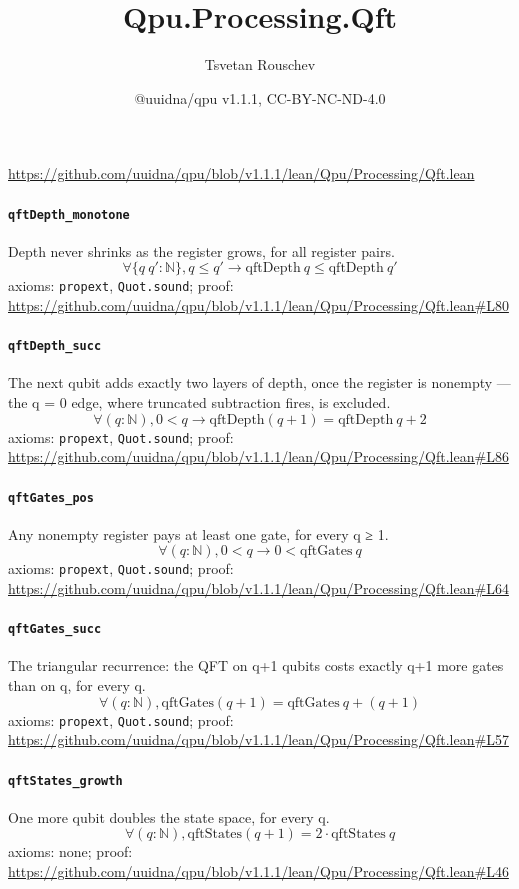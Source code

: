 \documentclass[11pt]{article}
\title{Qpu.Processing.Qft}
\author{Tsvetan Rouschev}
\date{@uuidna/qpu v1.1.1, CC-BY-NC-ND-4.0}
\begin{document}
\maketitle
\noindent\url{https://github.com/uuidna/qpu/blob/v1.1.1/lean/Qpu/Processing/Qft.lean}

\paragraph{\texttt{qftDepth\_monotone}}
Depth never shrinks as the register grows, for all register pairs.
\[ \forall \{q\ q' : \mathbb{N}\}, q \le q' \to \mathrm{qftDepth}\ q \le \mathrm{qftDepth}\ q' \]
\noindent axioms: \texttt{propext}, \texttt{Quot.sound}; proof: \url{https://github.com/uuidna/qpu/blob/v1.1.1/lean/Qpu/Processing/Qft.lean\#L80}

\paragraph{\texttt{qftDepth\_succ}}
The next qubit adds exactly two layers of depth, once the register is nonempty — the q = 0 edge, where truncated subtraction fires, is excluded.
\[ \forall (q : \mathbb{N}), 0 < q \to \mathrm{qftDepth} (q + 1) = \mathrm{qftDepth}\ q + 2 \]
\noindent axioms: \texttt{propext}, \texttt{Quot.sound}; proof: \url{https://github.com/uuidna/qpu/blob/v1.1.1/lean/Qpu/Processing/Qft.lean\#L86}

\paragraph{\texttt{qftGates\_pos}}
Any nonempty register pays at least one gate, for every q ≥ 1.
\[ \forall (q : \mathbb{N}), 0 < q \to 0 < \mathrm{qftGates}\ q \]
\noindent axioms: \texttt{propext}, \texttt{Quot.sound}; proof: \url{https://github.com/uuidna/qpu/blob/v1.1.1/lean/Qpu/Processing/Qft.lean\#L64}

\paragraph{\texttt{qftGates\_succ}}
The triangular recurrence: the QFT on q+1 qubits costs exactly q+1 more gates than on q, for every q.
\[ \forall (q : \mathbb{N}), \mathrm{qftGates} (q + 1) = \mathrm{qftGates}\ q + (q + 1) \]
\noindent axioms: \texttt{propext}, \texttt{Quot.sound}; proof: \url{https://github.com/uuidna/qpu/blob/v1.1.1/lean/Qpu/Processing/Qft.lean\#L57}

\paragraph{\texttt{qftStates\_growth}}
One more qubit doubles the state space, for every q.
\[ \forall (q : \mathbb{N}), \mathrm{qftStates} (q + 1) = 2 \cdot \mathrm{qftStates}\ q \]
\noindent axioms: none; proof: \url{https://github.com/uuidna/qpu/blob/v1.1.1/lean/Qpu/Processing/Qft.lean\#L46}
\end{document}
